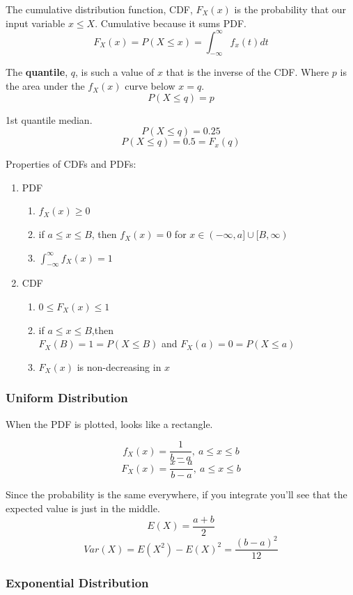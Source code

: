 \documentclass{article}
\begin{document}
The cumulative distribution function, CDF, $F_X(x)$ is the probability that our input variable $x \leq X$. Cumulative because it sums PDF. $$F_X(x) = P(X \leq x) = \int_{-\infty}^{\infty} f_x(t) dt$$

The \textbf{quantile}, $q$, is such a value of $x$ that is the inverse of the CDF. Where $p$ is the area under the $f_X(x)$ curve below $x=q$. $$P(X \leq q) = p$$

1st quantile median. $$P(X \leq q) = 0.25$$ $$P(X \leq q) = 0.5 = F_x(q)$$

Properties of CDFs and PDFs:

\begin{enumerate}
\item PDF \begin{enumerate}
\item $f_X(x) \geq 0$
\item if $a \leq x \leq B$, then $f_X(x) = 0$ for $x \in (-\infty, a] \cup [B, \infty)$
\item $\int_{-\infty}^{\infty} f_X(x) = 1$
\end{enumerate}
\item CDF \begin{enumerate}
\item $ 0 \leq F_X(x) \leq 1 $
\item if $a \leq x \leq B$,then \\ $F_X(B) = 1 = P(X \leq B)$ and $F_X(a) = 0 = P(X \leq a)$
\item $F_X(x)$ is non-decreasing in $x$
\end{enumerate}
\end{enumerate}

\subsubsection{Uniform Distribution}

When the PDF is plotted, looks like a rectangle.

$$ f_X(x) = \frac{1}{b-a},\ a \leq x \leq b $$
$$ F_X(x) = \frac{x-a}{b-a},\ a \leq x \leq b$$

Since the probability is the same everywhere, if you integrate you'll see that the expected value is just in the middle.
$$E(X) = \frac{a+b}{2}$$
$$Var(X) = E(X^2) - E(X)^2 = \frac{(b-a)^2}{12}$$

\subsubsection{Exponential Distribution}
\end{document}
